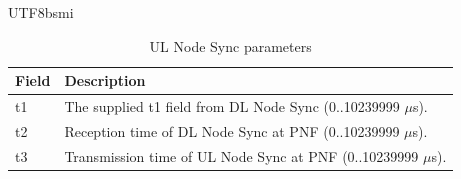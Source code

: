 \documentclass[conference,onecolumn]{IEEEtran}
\begin{document}
\begin{CJK}{UTF8}{bsmi}
\hrulefill\par\vspace{1cm}

\begin{table}[htbp]
\caption{UL Node Sync parameters}
\label{tab:ul_node_sync}
\begin{center}
\begin{tabularx}{\columnwidth}{l|X}
\toprule
\textbf{Field} & \textbf{Description} \\ \midrule
t1 & The supplied t1 field from DL Node Sync (0..10239999 $\mu$s). \\ \midrule
t2 & Reception time of DL Node Sync at PNF (0..10239999 $\mu$s). \\ \midrule
t3 & Transmission time of UL Node Sync at PNF (0..10239999 $\mu$s). \\ \bottomrule
\end{tabularx}
\end{center}
\end{table}

\hrulefill\par\vspace{1cm}




\end{CJK}
\end{document}
